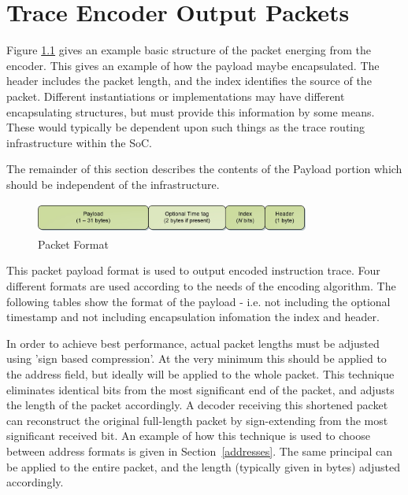 \chapter{Trace Encoder Output Packets} \label{packets}

Figure \ref{fig:packet-format} gives an example basic structure of the
packet energing from the encoder. This gives an example of how the
payload maybe encapsulated.  The header includes the packet length, and
the index identifies the source of the packet.  Different instantiations or
implementations may have different encapsulating structures, but must
provide this information by some means. These
would typically be dependent upon such things as the trace routing
infrastructure within the SoC.

The remainder of this section describes the contents of the Payload
portion which should be independent of the infrastructure.

\begin{figure}[h]
\begin{center}
  \includegraphics[height=1cm, width=9cm]{newPacket.jpg}
  \caption{Packet Format}
  \label{fig:packet-format}
\end{center}
\end{figure}


This packet payload format is used to output encoded instruction
trace.  Four different formats are used according to the needs of the
encoding algorithm. The following tables show the format of the
payload - i.e. not including the optional timestamp and not including
encapsulation infomation the index and header.

In order to achieve best performance, actual packet lengths must be adjusted using 'sign based compression'.
At the very minimum this should be applied to the address field, but ideally will be applied to the whole 
packet.  This technique eliminates identical bits from the most significant end of the packet, and adjusts
the length of the packet accordingly.  A decoder receiving this shortened packet can reconstruct the 
original full-length packet by sign-extending from the most significant received bit.  An example of how
this technique is used to choose between address formats is given in Section~\ref{addresses}.  The same
principal can be applied to the entire packet, and the length (typically given in bytes) adjusted 
accordingly.

